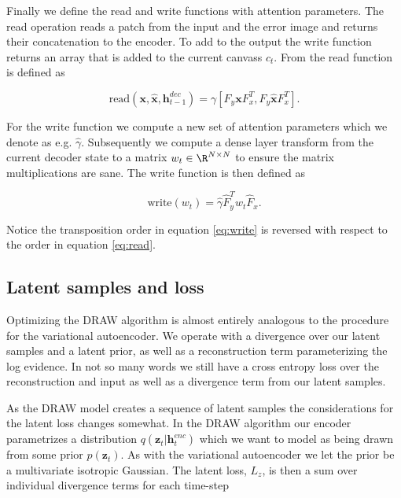 Finally we define the read and write functions with attention parameters. The read operation reads a patch from the input and the error image and returns their concatenation to the encoder. To add to the output the write function returns an array that is added to the current canvass $c_t$. From \citet{Gregor2015} the read function is defined as

\begin{equation}\label{eq:read}
\text{read}(\mathbf{x}, \mathbf{\hat{x}}, \mathbf{h}_{t-1}^{dec}) = \gamma[F_y \mathbf{x} F_x^T, F_y \mathbf{\hat{x}} F_x^T].
\end{equation} 

\noindent For the write function we compute a new set of attention parameters which we denote as e.g. $\hat{\gamma}$. Subsequently we compute a dense layer transform from the current decoder state to a matrix $w_t \in \R^{N \times N}$ to ensure the matrix multiplications are sane. The write function is then defined as

\begin{equation}\label{eq:write}
\text{write}(w_t)  = \hat{\gamma} \hat{F}^T_y w_t \hat{F}_x.
\end{equation}

\noindent Notice the transposition order in equation \ref{eq:write} is reversed with respect to the order in equation \ref{eq:read}. 

\subsection{Latent samples and loss}

Optimizing the DRAW algorithm is almost entirely analogous to the procedure for the variational autoencoder. We operate with a divergence over our latent samples and a latent prior, as well as a reconstruction term parameterizing the log evidence. In not so many words we still have a cross entropy loss over the reconstruction and input as well as a divergence term from our latent samples.  

As the DRAW model creates a sequence of latent samples the considerations for the latent loss changes somewhat. In the DRAW algorithm our encoder parametrizes a distribution $q(\mathbf{z}_t | \mathbf{h}_t^{enc})$ which we want to model as being drawn from some prior $p(\mathbf{z}_t)$. As with the variational autoencoder we let the prior be a multivariate isotropic Gaussian. The latent loss, $L_z$, is then a sum over individual divergence terms for each time-step

